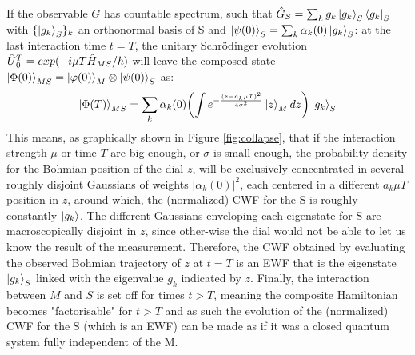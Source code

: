 \documentclass[11pt, a4paper]{article} %
\begin{document}
If the observable $G$ has countable spectrum, such that $\hat{G}_S=\sum_k g_k \ket{g_k}_S\bra{g_k}_S$ with $\{\ket{g_k}_S\}_k$ an orthonormal basis of S and $\ket{\psi(0)}_S=\sum_k \alpha_k(0)\ket{g_k}_S$: at the last interaction time $t=T$, the unitary Schrödinger evolution $\hat{U} \null_{0}^T=exp(-i\mu T \hat{H}_{MS}/\hbar)$ will leave the composed state $\ket{\Phi(0)}_{MS}=\ket{\varphi(0)}_M\otimes\ket{\psi(0)}_S$ as:
\begin{equation}\label{postM1}
\ket{\Phi(T)}_{MS}=\sum_k \alpha_k(0)\qty(\int e^{-\frac{(z-a_k\mu T)^2}{4\sigma^2}}\ket{z}_M dz )\ket{g_k}_S
\end{equation}
This means, as graphically shown in Figure \ref{fig:collapse}, that if the interaction strength $\mu$ or time $T$ are big enough, or $\sigma$ is small enough, the probability density for the Bohmian position of the dial $z$, will be exclusively concentrated in several roughly disjoint Gaussians of weights $|\alpha_k(0)|^2$, each centered in a different $a_k \mu T$ position in $z$, around which, the (normalized) CWF for the S is roughly constantly $\ket{g_k}$. The different Gaussians enveloping each eigenstate for S are macroscopically disjoint in $z$, since other-wise the dial would not be able to let us know the result of the measurement. Therefore, the CWF obtained by evaluating the observed Bohmian trajectory of $z$ at $t=T$ is an EWF that is the eigenstate $\ket{g_k}_S$ linked with the eigenvalue $g_k$ indicated by $z$. Finally, the interaction between $M$ and $S$ is set off for times $t>T$, meaning the composite Hamiltonian becomes "factorisable" for $t>T$ and as such the evolution of the (normalized) CWF for the S (which is an EWF) can be made as if it was a closed quantum system fully independent of the M. 

\end{document}
